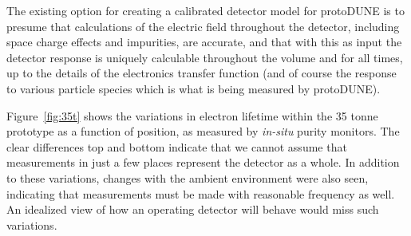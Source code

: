 	The existing option for creating a calibrated detector model for
protoDUNE is to presume that calculations of the electric field throughout the
detector, including space charge effects and impurities, are accurate, and that
with this as input the detector response is uniquely calculable throughout the
volume and for all times, up to the details of the electronics transfer
function (and of course the response to various particle species which is what
is being measured by protoDUNE).  

	Figure~\ref{fig:35t} shows the variations in electron lifetime within
the 35 tonne prototype as a function of position, as measured by {\it in-situ}
purity monitors. The clear differences top and bottom indicate that we cannot
assume that measurements in just a few places represent the detector as a
whole. In addition to these variations, changes with the ambient environment
were also seen, indicating that measurements must be made with reasonable
frequency as well.  An idealized view of how an operating detector will behave
would miss such variations.
	 
